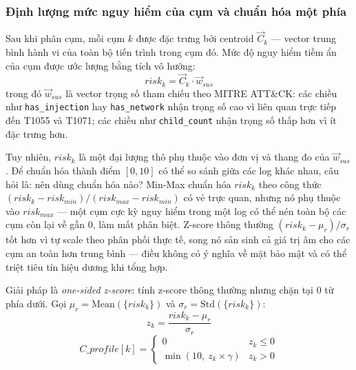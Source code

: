 \documentclass[../main.tex]{subfiles}
\begin{document}
\subsubsection{Định lượng mức nguy hiểm của cụm và chuẩn hóa một phía}
\label{subsubsection:2.4.3.3}

Sau khi phân cụm, mỗi cụm $k$ được đặc trưng bởi centroid $\vec{C}_k$ — vector trung bình hành vi của toàn bộ tiến trình trong cụm đó. Mức độ nguy hiểm tiềm ẩn của cụm được ước lượng bằng tích vô hướng:
\begin{equation}
    risk_k = \vec{C}_k \cdot \vec{w}_{sus} \tag{1.13}
\end{equation}
trong đó $\vec{w}_{sus}$ là vector trọng số tham chiếu theo MITRE ATT\&CK: các chiều như \texttt{has\_injection} hay \texttt{has\_network} nhận trọng số cao vì liên quan trực tiếp đến T1055 và T1071; các chiều như \texttt{child\_count} nhận trọng số thấp hơn vì ít đặc trưng hơn.

Tuy nhiên, $risk_k$ là một đại lượng thô phụ thuộc vào đơn vị và thang đo của $\vec{w}_{sus}$. Để chuẩn hóa thành điểm $[0, 10]$ có thể so sánh giữa các log khác nhau, câu hỏi là: nên dùng chuẩn hóa nào? Min-Max chuẩn hóa $risk_k$ theo công thức $(risk_k - risk_{min})/(risk_{max} - risk_{min})$ có vẻ trực quan, nhưng nó phụ thuộc vào $risk_{max}$ — một cụm cực kỳ nguy hiểm trong một log có thể nén toàn bộ các cụm còn lại về gần 0, làm mất phân biệt. Z-score thông thường $(risk_k - \mu_r)/\sigma_r$ tốt hơn vì tự scale theo phân phối thực tế, song nó sản sinh cả giá trị âm cho các cụm an toàn hơn trung bình — điều không có ý nghĩa về mặt bảo mật và có thể triệt tiêu tín hiệu dương khi tổng hợp.

Giải pháp là \textit{one-sided z-score}: tính z-score thông thường nhưng chặn tại 0 từ phía dưới. Gọi $\mu_r = \text{Mean}(\{risk_k\})$ và $\sigma_r = \text{Std}(\{risk_k\})$:
\begin{equation}
    z_k = \frac{risk_k - \mu_r}{\sigma_r} \tag{1.14}
\end{equation}
\begin{equation}
    C\_profile[k] = \begin{cases} 0 & z_k \le 0 \\ \min\!\left(10,\ z_k \times \gamma\right) & z_k > 0 \end{cases} \tag{1.15}
\end{equation}
\end{document}
